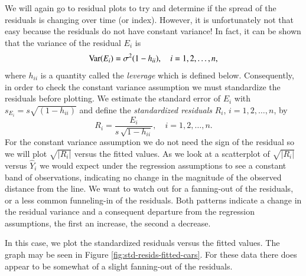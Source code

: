 \documentclass[captions=tableheading]{scrbook}
\begin{document}
We will again go to residual plots to try and determine if the spread of the residuals is changing over time (or index). However, it is unfortunately not that easy because the residuals do not have constant variance! In fact, it can be shown that the variance of the residual \(E_{i}\) is 
\begin{equation}
\mbox{Var\ensuremath{(E_{i})}}=\sigma^{2}(1-h_{ii}),\quad i=1,2,\ldots,n,
\end{equation}
where \(h_{ii}\) is a quantity called the \emph{leverage} which is defined below. Consequently, in order to check the constant variance assumption we must standardize the residuals before plotting. We estimate the standard error of \(E_{i}\) with \(s_{E_{i}}=s\sqrt{(1-h_{ii})}\) and define the \emph{standardized residuals} \(R_{i}\), \(i=1,2,\ldots,n\), by 
\begin{equation} 
R_{i}=\frac{E_{i}}{s\,\sqrt{1-h_{ii}}},\quad i=1,2,\ldots,n.
\end{equation}
For the constant variance assumption we do not need the sign of the residual so we will plot \(\sqrt{|R_{i}|}\) versus the fitted values. As we look at a scatterplot of \(\sqrt{|R_{i}|}\) versus \(\hat{Y}_{i}\) we would expect under the regression assumptions to see a constant band of observations, indicating no change in the magnitude of the observed distance from the line. We want to watch out for a fanning-out of the residuals, or a less common funneling-in of the residuals. Both patterns indicate a change in the residual variance and a consequent departure from the regression assumptions, the first an increase, the second a decrease.

In this case, we plot the standardized residuals versus the fitted values. The graph may be seen in Figure \ref{fig:std-resids-fitted-cars}. For these data there does appear to be somewhat of a slight fanning-out of the residuals.
\end{document}
